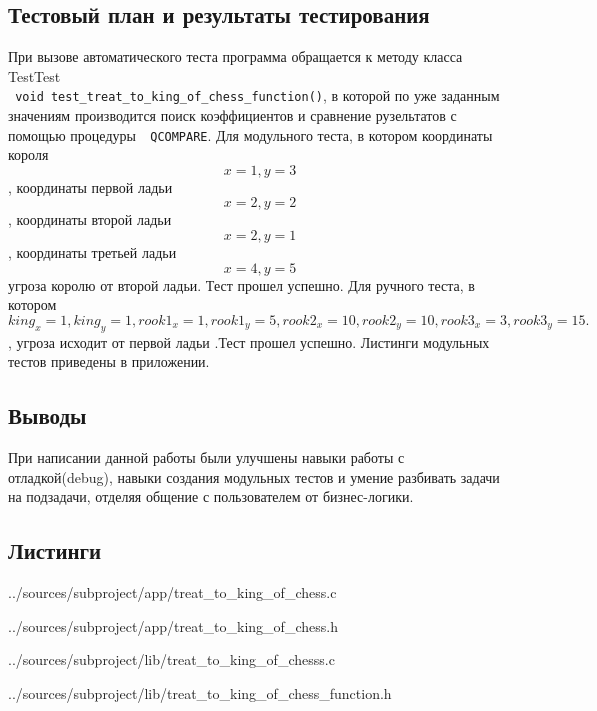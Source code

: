 \documentclass[12pt,a4paper]{report}
\begin{document}
\subsection{Тестовый план и результаты тестирования}
При вызове автоматического теста программа обращается к методу класса TestTest \\ \verb+ void test_treat_to_king_of_chess_function()+, в которой по уже заданным значениям производится поиск коэффициентов и сравнение рузельтатов с помощью процедуры\verb+  QCOMPARE+.
Для модульного теста, в котором координаты короля 
\begin{equation}
x=1,y=3
\end{equation},
координаты первой ладьи
\begin{equation}
x=2,y=2
\end{equation} ,
координаты второй ладьи
\begin{equation}
x=2,y=1
\end{equation},
координаты третьей ладьи
\begin{equation}
x=4,y=5
\end{equation}
угроза королю от второй ладьи. Тест прошел успешно.
Для ручного теста, в котором \begin{equation}king_x=1, king_y=1, rook1_x=1, rook1_y=5, rook2_x=10, rook2_y=10, rook3_x=3, rook3_y=15.\end{equation}, угроза исходит от первой ладьи .Тест прошел успешно.
Листинги модульных тестов приведены в приложении.

\subsection{Выводы}
При написании данной работы были улучшены навыки работы с отладкой(debug), навыки создания модульных тестов и умение разбивать задачи на подзадачи, отделяя общение с пользователем от бизнес-логики.
\subsection*{Листинги}


{../sources/subproject/app/treat_to_king_of_chess.c}


{../sources/subproject/app/treat_to_king_of_chess.h}


{../sources/subproject/lib/treat_to_king_of_chesss.c}


{../sources/subproject/lib/treat_to_king_of_chess_function.h}
\end{document}
